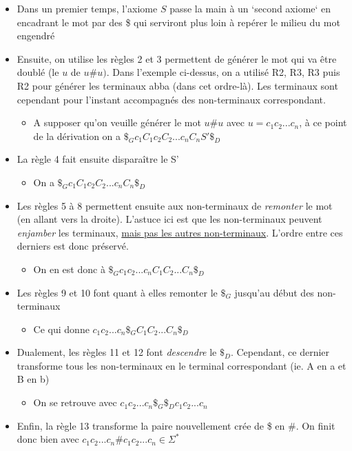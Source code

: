 \documentclass{article}[11pt]
\theoremstyle{definition}
\begin{document}
\begin{itemize}
\item Dans un premier temps, l'axiome $S$ passe la main à un `second axiome` en encadrant le mot par des \$ qui serviront plus loin à repérer le milieu du mot engendré
\item Ensuite, on utilise les règles 2 et 3 permettent de générer le mot qui va être doublé (le $u$ de $u\#u)$. Dans l'exemple ci-dessus, on a utilisé R2, R3, R3 puis R2 pour générer les terminaux abba (dans cet ordre-là). Les terminaux sont cependant pour l'instant accompagnés des non-terminaux correspondant.
\begin{itemize}
\item[] A supposer qu'on veuille générer le mot $u\#u$ avec $u = c_1c_2...c_n$, à ce point de la dérivation on a $\$_Gc_1C_1c_2C_2...c_nC_nS'\$_D$
\end{itemize}
\item La règle 4 fait ensuite disparaître le S'
\begin{itemize}
\item[] On a $\$_Gc_1C_1c_2C_2...c_nC_n\$_D$
\end{itemize}
\item Les règles 5 à 8 permettent ensuite aux non-terminaux de \textit{remonter} le mot (en allant vers la droite). L'astuce ici est que les non-terminaux peuvent \textit{enjamber} les terminaux, \underline{mais pas les autres non-terminaux}. L'ordre entre ces derniers est donc préservé.
\begin{itemize}
\item[] On en est donc à $\$_Gc_1c_2...c_nC_1C_2...C_n\$_D$
\end{itemize}
\item Les règles 9 et 10 font quant à elles remonter le $\$_G$ jusqu'au début des non-terminaux
\begin{itemize}
\item[] Ce qui donne $c_1c_2...c_n\$_GC_1C_2...C_n\$_D$
\end{itemize}
\item Dualement, les règles 11 et 12 font \textit{descendre} le $\$_D$. Cependant, ce dernier transforme tous les non-terminaux en le terminal correspondant (ie. A en a et B en b)
\begin{itemize}
\item[] On se retrouve avec $c_1c_2...c_n\$_G\$_Dc_1c_2...c_n$
\end{itemize}
\item Enfin, la règle 13 transforme la paire nouvellement crée de \$ en \#. On finit donc bien avec  $c_1c_2...c_n\#c_1c_2...c_n \in \Sigma^*$
\end{itemize}




\end{document}
